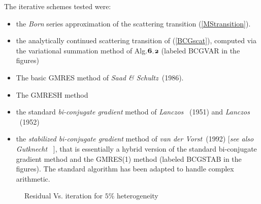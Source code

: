 The iterative schemes tested were:
\begin{itemize}

\item the {\em Born} series approximation of the scattering transition
(\ref{MStransition}). 

\item the analytically continued scattering transition of (\ref{BCGscat}),
computed via the  variational summation method of Alg.${\mbox{\boldmath$\mit 6$\unboldmath}}$.${\mbox{\boldmath$\mit 2$\unboldmath}}$ 
(labeled {\sc BCGVAR\/} in the figures)

\item The basic {\sc GMRES\/} method of {\em Saad \& Schultz\/}~(1986).

\item The {\sc GMRESH} method

\item the standard {\em bi-conjugate gradient\/}  method of {\em 
Lanczos\/} 
~(1951) and {\em Lanczos\/} ~(1952)

\item the {\em stabilized bi-conjugate gradient} method of {\em van der 
Vorst\/}~(1992) [{\em see also\/} {\em Gutknecht\/}~ 
], that is essentially a hybrid version of the 
standard bi-conjugate gradient method and the GMRES(1) method (labeled 
{\sc 
BCGSTAB\/} in the figures). The standard algorithm has been adapted to 
handle complex arithmetic. 

\end{itemize} 


\begin{figure}
\HideDisplacementBoxes
\centerline{}
\caption{Residual Vs. iteration for $5\%$ heterogeneity}
\protect\label{it05error}
\end{figure}


